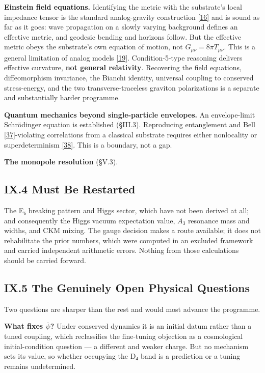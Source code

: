 \documentclass[a4paper,11pt]{article}
\begin{document}
\textbf{Einstein field equations.} Identifying the metric with the substrate's local impedance tensor is the standard analog-gravity construction \hyperref[ref16]{[16]} and is sound as far as it goes: wave propagation on a slowly varying background defines an effective metric, and geodesic bending and horizons follow. But the effective metric obeys the substrate's own equation of motion, not $G_{\mu\nu}=8\pi T_{\mu\nu}$. This is a general limitation of analog models \hyperref[ref19]{[19]}. Condition-5-type reasoning delivers effective curvature, \textbf{not general relativity}. Recovering the field equations, diffeomorphism invariance, the Bianchi identity, universal coupling to conserved stress-energy, and the two transverse-traceless graviton polarizations is a separate and substantially harder programme.

\textbf{Quantum mechanics beyond single-particle envelopes.} An envelope-limit Schrödinger equation is established (§III.3). Reproducing entanglement and Bell \hyperref[ref37]{[37]}-violating correlations from a classical substrate requires either nonlocality or superdeterminism \hyperref[ref38]{[38]}. This is a boundary, not a gap.

\textbf{The monopole resolution} (§V.3).

\subsection*{IX.4 Must Be Restarted}

The E₆ breaking pattern and Higgs sector, which have not been derived at all; and consequently the Higgs vacuum expectation value, $A_3$ resonance mass and widths, and CKM mixing. The gauge decision makes a route available; it does not rehabilitate the prior numbers, which were computed in an excluded framework and carried independent arithmetic errors. Nothing from those calculations should be carried forward.

\subsection*{IX.5 The Genuinely Open Physical Questions}

Two questions are sharper than the rest and would most advance the programme.

\textbf{What fixes $\bar\psi$?} Under conserved dynamics it is an initial datum rather than a tuned coupling, which reclassifies the fine-tuning objection as a cosmological initial-condition question — a different and weaker charge. But no mechanism sets its value, so whether occupying the D₄ band is a prediction or a tuning remains undetermined.
\end{document}

